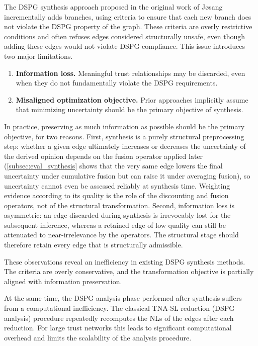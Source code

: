 The \ac{DSPG} synthesis approach proposed in the original work of J{\o}sang~\cite{10.5555/1151699.1151710} incrementally adds branches, using criteria to ensure that each new branch does not violate the \ac{DSPG} property of the graph. These criteria are overly restrictive conditions and often refuses edges considered structurally unsafe, even though adding these edges would not violate \ac{DSPG} compliance. This issue introduces two major limitations.
\begin{enumerate}
    \item \textbf{Information loss.} Meaningful trust relationships may be discarded, even when they do not fundamentally violate the \ac{DSPG} requirements.
    \item \textbf{Misaligned optimization objective.} Prior approaches implicitly assume that minimizing uncertainty should be the primary objective of synthesis. 
\end{enumerate}
In practice, preserving as much information as possible should be the primary objective, for two reasons. First, synthesis is a purely structural preprocessing step: whether a given edge ultimately increases or decreases the uncertainty of the derived opinion depends on the fusion operator applied later (\cref{subsec:eval_synthesis} shows that the very same edge lowers the final uncertainty under cumulative fusion but can raise it under averaging fusion), so uncertainty cannot even be assessed reliably at synthesis time. Weighting evidence according to its quality is the role of the discounting and fusion operators, not of the structural transformation. Second, information loss is asymmetric: an edge discarded during synthesis is irrevocably lost for the subsequent inference, whereas a retained edge of low quality can still be attenuated to near-irrelevance by the operators. The structural stage should therefore retain every edge that is structurally admissible.

These observations reveal an inefficiency in existing \ac{DSPG} synthesis methods. The criteria are overly conservative, and the transformation objective is partially aligned with information preservation.

At the same time, the \ac{DSPG} analysis phase performed after synthesis suffers from a computational inefficiency. The classical \ac{TNA-SL} reduction (\ac{DSPG} analysis) procedure repeatedly recomputes the \acp{NL} of the edges after each reduction. For large trust networks this leads to significant computational overhead and limits the scalability of the analysis procedure.

